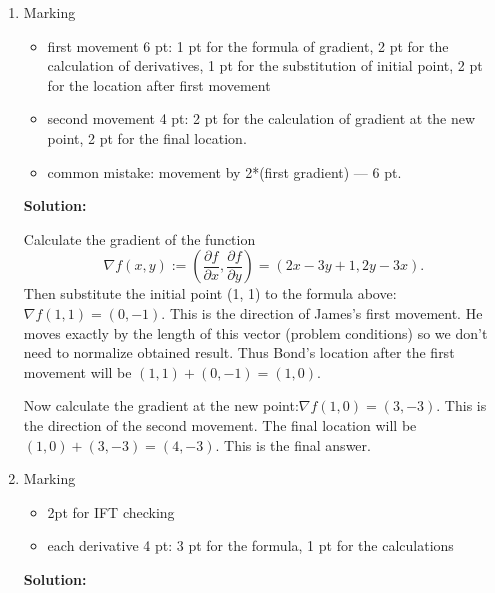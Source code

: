 \documentclass[12pt]{article} %
\theoremstyle{definition} %
\begin{document}
\begin{enumerate}

\item Marking
\begin{itemize}
\item first movement 6 pt: 1 pt for the formula of gradient, 2 pt for the calculation of derivatives, 1 pt for the substitution of initial point, 2 pt for the location after first movement

\item second movement 4 pt: 2 pt for the calculation of gradient at the new point, 2 pt for the final location.

\item common mistake: movement by 2*(first gradient) --- 6 pt.
\end{itemize}
\textbf{Solution:}

Calculate the gradient of the function
\[
\nabla f(x,y):=(\frac{\partial f}{\partial x}, \frac{\partial f}{\partial y})=(2x-3y+1, 2y -3x).
\]
Then substitute the initial point (1, 1) to the formula above: $\nabla f(1,1)=(0,-1).$ This is the direction of James's first movement. He moves exactly by the length of this vector (problem conditions) so we don't need to normalize obtained result. Thus Bond's location after the first movement will be $(1,1)+(0,-1)=(1,0).$

Now calculate the gradient at the new point:$\nabla f(1,0)=(3,-3).$ This is the direction of the second movement. The final location will be $(1,0)+(3,-3)=(4,-3).$ This is the final answer.


\item Marking
\begin{itemize}
\item 2pt for IFT checking
\item each derivative 4 pt: 3 pt for the formula, 1 pt for the calculations
\end{itemize}
\textbf{Solution:}


\end{enumerate}
\end{document}
